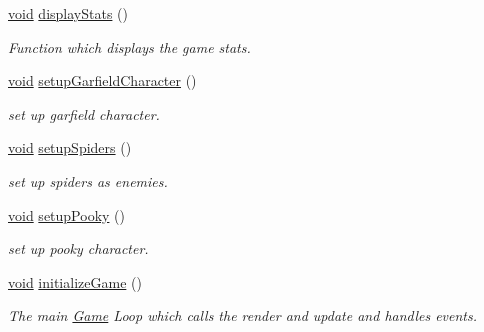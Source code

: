 \begin{DoxyCompactItemize}
\mbox{\hyperlink{_s_d_l__opengles2__gl2ext_8h_ae5d8fa23ad07c48bb609509eae494c95}{void}} \mbox{\hyperlink{class_game_afb705aeed0fc1c78e264c58fbccf912a}{display\+Stats}} ()
\begin{DoxyCompactList}\small\item\em Function which displays the game stats. \end{DoxyCompactList}\item 
\mbox{\hyperlink{_s_d_l__opengles2__gl2ext_8h_ae5d8fa23ad07c48bb609509eae494c95}{void}} \mbox{\hyperlink{class_game_a189a08079cbe642a324f19d0072faee7}{setup\+Garfield\+Character}} ()
\begin{DoxyCompactList}\small\item\em set up garfield character. \end{DoxyCompactList}\item 
\mbox{\hyperlink{_s_d_l__opengles2__gl2ext_8h_ae5d8fa23ad07c48bb609509eae494c95}{void}} \mbox{\hyperlink{class_game_a73567ddd32989b5fc977b61b4c927c89}{setup\+Spiders}} ()
\begin{DoxyCompactList}\small\item\em set up spiders as enemies. \end{DoxyCompactList}\item 
\mbox{\hyperlink{_s_d_l__opengles2__gl2ext_8h_ae5d8fa23ad07c48bb609509eae494c95}{void}} \mbox{\hyperlink{class_game_a01e43c5cb9e24153bc3dc40bf9523ec1}{setup\+Pooky}} ()
\begin{DoxyCompactList}\small\item\em set up pooky character. \end{DoxyCompactList}\item 
\mbox{\hyperlink{_s_d_l__opengles2__gl2ext_8h_ae5d8fa23ad07c48bb609509eae494c95}{void}} \mbox{\hyperlink{class_game_a4c2a7ead717a4c13f1ffddafd11e17c8}{initialize\+Game}} ()
\begin{DoxyCompactList}\small\item\em The main \mbox{\hyperlink{class_game}{Game}} Loop which calls the render and update and handles events. \end{DoxyCompactList}\end{DoxyCompactItemize}
